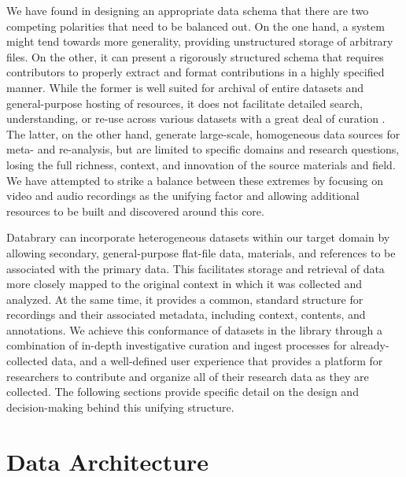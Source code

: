 \documentclass{sig-alternate}
\begin{document}
We have found in designing an appropriate data schema that there are two competing polarities that need to be balanced out. On the one hand, a system might tend towards more generality, providing unstructured storage of arbitrary files. On the other, it can present a rigorously structured schema that requires contributors to properly extract and format contributions in a highly specified manner.
While the former is well suited for archival of entire datasets and general-purpose hosting of resources, it does not facilitate detailed search, understanding, or re-use across various datasets with a great deal of curation \cite{Peer_2012}.
The latter, on the other hand, generate large-scale, homogeneous data sources for meta- and re-analysis, but are limited to specific domains and research questions, losing the full richness, context, and innovation of the source materials and field.
We have attempted to strike a balance between these extremes by focusing on video and audio recordings as the unifying factor and allowing additional resources to be built and discovered around this core.

Databrary can incorporate heterogeneous datasets within our target domain by allowing secondary, general-purpose flat-file data, materials, and references to be associated with the primary data.
This facilitates storage and retrieval of data more closely mapped to the original context in which it was collected and analyzed.
At the same time, it provides a common, standard structure for recordings and their associated metadata, including context, contents, and annotations.
We achieve this conformance of datasets in the library through a combination of in-depth investigative curation and ingest processes for already-collected data, and a well-defined user experience that provides a platform for researchers to contribute and organize all of their research data as they are collected.
The following sections provide specific detail on the design and decision-making behind this unifying structure.

\section{Data Architecture}

\end{document}

